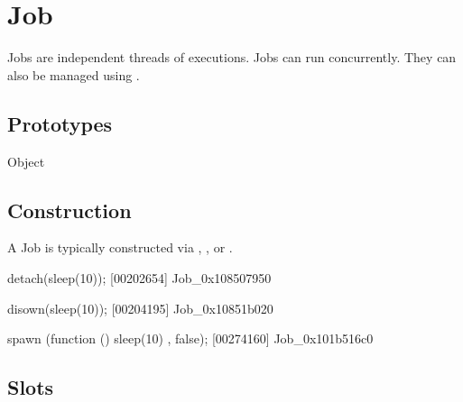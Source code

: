 
\section{Job}

Jobs are independent threads of executions.  Jobs can run concurrently.
They can also be managed using .

\subsection{Prototypes}

\begin{refObjects}
\item[Object]
\end{refObjects}

\subsection{Construction}

A Job is typically constructed via ,
, or .

\begin{urbiscript}
detach(sleep(10));
[00202654] Job_0x108507950

disown(sleep(10));
[00204195] Job_0x10851b020

spawn (function () { sleep(10) }, false);
[00274160] Job_0x101b516c0
\end{urbiscript}

\subsection{Slots}

